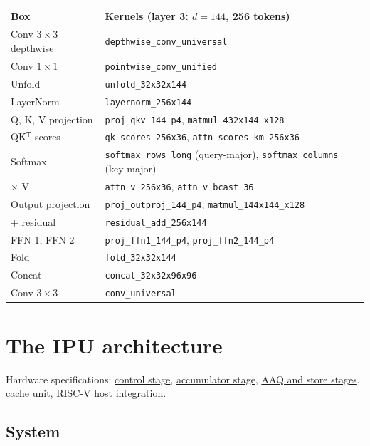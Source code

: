 \documentclass[11pt,a4paper]{article}
\renewcommand{\arraystretch}{1.2}
\newcommand{\doc}[2]{\href{https://rechefe.github.io/ipu-emulator/#1/}{\textcolor{accent}{#2}}}
\begin{document}
\begin{center}
\footnotesize\renewcommand{\arraystretch}{1.0}
\begin{tabularx}{\linewidth}{lX}
\toprule
Box & Kernels (layer 3: $d=144$, 256 tokens) \\
\midrule
Conv $3\times3$ depthwise & \texttt{depthwise\_conv\_universal} \\
Conv $1\times1$ & \texttt{pointwise\_conv\_unified} \\
Unfold & \texttt{unfold\_32x32x144} \\
LayerNorm & \texttt{layernorm\_256x144} \\
Q, K, V projection & \texttt{proj\_qkv\_144\_p4}, \texttt{matmul\_432x144\_x128} \\
QK$^\mathsf{T}$ scores & \texttt{qk\_scores\_256x36}, \texttt{attn\_scores\_km\_256x36} \\
Softmax & \texttt{softmax\_rows\_long} (query-major), \texttt{softmax\_columns} (key-major) \\
$\times$ V & \texttt{attn\_v\_256x36}, \texttt{attn\_v\_bcast\_36} \\
Output projection & \texttt{proj\_outproj\_144\_p4}, \texttt{matmul\_144x144\_x128} \\
+ residual & \texttt{residual\_add\_256x144} \\
FFN 1, FFN 2 & \texttt{proj\_ffn1\_144\_p4}, \texttt{proj\_ffn2\_144\_p4} \\
Fold & \texttt{fold\_32x32x144} \\
Concat & \texttt{concat\_32x32x96x96} \\
Conv $3\times3$ & \texttt{conv\_universal} \\
\bottomrule
\end{tabularx}
\end{center}

\section{The IPU architecture}\label{sec:arch}

Hardware specifications: \doc{specs/stage-control}{control stage},
\doc{specs/stage-accumulator}{accumulator stage}, \doc{specs/stage-aaq-str}{AAQ and store stages},
\doc{specs/cache-unit}{cache unit}, \doc{specs/riscv-host-integration}{RISC-V host integration}.

\subsection{System}
\end{document}
